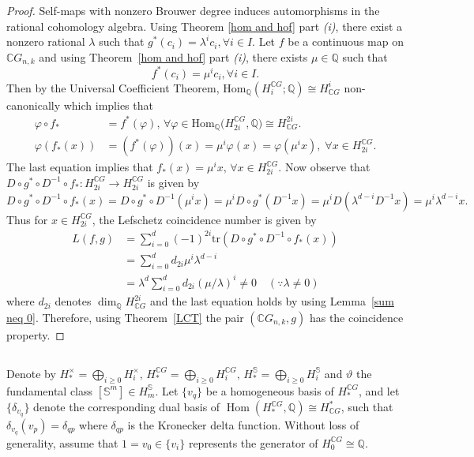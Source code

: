 \documentclass{amsart}
\newcommand{\thmref}[1]{Theorem~\ref{#1}}
\newcommand{\lemref}[1]{Lemma~\ref{#1}}
\renewcommand{\hom}{\mathrm{Hom}}
\begin{document}
	
	\begin{proof}
	Self-maps with nonzero Brouwer degree induces automorphisms in the rational cohomology algebra. Using Theorem \ref{hom and hof} part \textit{(i)}, there exist a nonzero rational $\lambda$ such that $g^*(c_i)=\lambda^ic_i, \forall i\in I.$ Let $f$ be a continuous map on $\mathbb CG_{n,k}$ and using \thmref{hom and hof} part \textit{(i)}, there exists $\mu \in \mathbb Q$ such that
		\[
		f^*(c_i)=\mu^ic_i, \forall i\in I.
		\]
		Then by the Universal Coefficient Theorem, $ \hom_{\mathbb{Q}} (H_i^{\mathbb CG};\mathbb Q) \cong H^i_{\mathbb CG}$ non-canonically which implies that 
		\begin{align*}
			\varphi \circ f_* &= f^*(\varphi) , \, \forall
			\varphi \in \hom _{\mathbb Q}\big(H_{2i}^{\mathbb CG}, \mathbb Q\big)\cong H^{2i}_{\mathbb CG}.\\
			\varphi(f_*(x))&=(f^*(\varphi))(x)= \mu^i\varphi(x)=\varphi(\mu^ix),\; \forall x\in H_{2i}^{\mathbb CG}.
		\end{align*}
		The last equation implies that $f_*(x)=\mu^ix,\, \forall x\in  H_{2i}^{\mathbb CG}.$
		Now observe that $D\circ g^*\circ D^{-1}\circ f_*: H_{2i}^{\mathbb CG}\to H_{2i}^{\mathbb CG}$ is given by 
		\[
		D\circ g^*\circ D^{-1}\circ f_*(x)=D\circ g^*\circ D^{-1}(\mu^ix)=\mu^iD\circ g^*(D^{-1}x)=\mu^iD(\lambda^{d-i}D^{-1}x)=\mu^i\lambda^{d-i}x.
		\]
		Thus for $x\in H_{2i}^{\mathbb{C}G}$, the Lefschetz coincidence number is given by
		\[
		\begin{array}{ll}
			L(f,g) &= \sum_{i=0}^d (-1)^{2i}
			\mathrm{tr}(D\circ g^*\circ D^{-1}\circ f_*(x)) \\[6pt]
			&=  \sum_{i=0}^d d_{2i}\mu^i\lambda^{d-i}  \\[6pt]
			&= \lambda^d \sum_{i=0}^d d_{2i}(\mu/\lambda)^i \neq 0 \quad (\because \lambda\neq 0) 
		\end{array}
		\]
		where $d_{2i}$ denotes $\dim_{\mathbb Q}H^{2i}_{\mathbb CG}$ and the last equation holds by using \lemref{sum neq 0}. Therefore, using \thmref{LCT} the pair $(\mathbb{C}G_{n,k},g)$ has the coincidence property.
	\end{proof}
	
	\subsection{} Denote by $H_*^\times = \bigoplus_{i\geq 0} H_i^{\times},\, H_*^{\mathbb{C}G} = \bigoplus_{i\geq 0} H_i^{\mathbb{C}G},\, H_*^{\mathbb{S}} = \bigoplus_{i\geq 0} H_i^{\mathbb{S}}$ and $\vartheta$ the fundamental class $[\mathbb S^m]\in H_m^{\mathbb S}$. Let $\{v_q\}$ be a homogeneous basis of $H_*^{\mathbb{C}G}$, and let $\{\delta_{v_q}\}$ denote the corresponding dual basis of  
	$\operatorname{Hom}(H_*^{\mathbb{C}G}, \mathbb Q) \cong H^*_{\mathbb{C}G}$, such that  
	$ \delta_{v_q} (v_p) = \delta_{qp}$ where $\delta_{qp}$ is the Kronecker delta function. Without loss of generality, assume that $1=v_0 \in \{v_i\}$ represents the generator of $H_0^{\mathbb{C}G} \cong \mathbb Q$.
	
\end{document}
